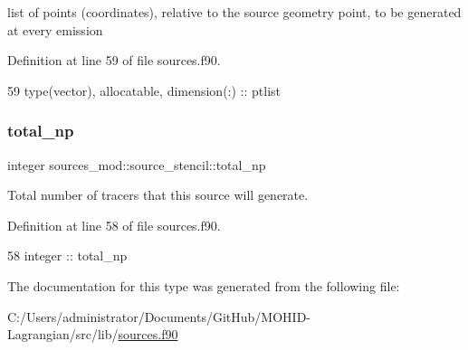 list of points (coordinates), relative to the source geometry point, to be generated at every emission 



Definition at line 59 of file sources.\+f90.


\begin{DoxyCode}
59         \textcolor{keywordtype}{type}(vector), \textcolor{keywordtype}{allocatable}, \textcolor{keywordtype}{dimension(:)} :: ptlist
\end{DoxyCode}
\mbox{\label{structsources__mod_1_1source__stencil_ad7373d51bdf50a4595b6c0fa69f7f915}} 
\subsubsection{\texorpdfstring{total\+\_\+np}{total\_np}}
{\footnotesize\ttfamily integer sources\+\_\+mod\+::source\+\_\+stencil\+::total\+\_\+np\hspace{0.3cm}{\ttfamily [private]}}



Total number of tracers that this source will generate. 



Definition at line 58 of file sources.\+f90.


\begin{DoxyCode}
58         \textcolor{keywordtype}{integer} :: total\_np
\end{DoxyCode}


The documentation for this type was generated from the following file\+:\begin{DoxyCompactItemize}
\item 
C\+:/\+Users/administrator/\+Documents/\+Git\+Hub/\+M\+O\+H\+I\+D-\/\+Lagrangian/src/lib/\mbox{\hyperlink{sources_8f90}{sources.\+f90}}\end{DoxyCompactItemize}
